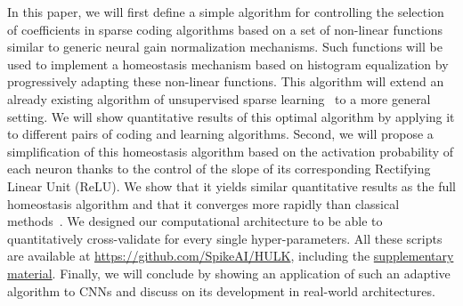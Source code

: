 \documentclass[vision,article,submit,oneauthor,pdftex]{Definitions/mdpi}
\newcommand{\Website}{https://spikeai.github.io/HULK}%
\begin{document}
In this paper, we will first define a simple algorithm for controlling the selection of coefficients in sparse coding algorithms based on a set of non-linear functions similar to generic neural gain normalization mechanisms. Such functions will be used to implement a homeostasis mechanism based on histogram equalization by progressively adapting these non-linear functions. This algorithm will extend an already existing algorithm of unsupervised sparse learning~\citep{Perrinet10shl} to a more general setting. We will show quantitative results of this optimal algorithm by applying it to different pairs of coding and learning algorithms. Second, we will propose a simplification of this homeostasis algorithm based on the activation probability of each neuron thanks to the control of the slope of its corresponding Rectifying Linear Unit (ReLU). We show that it yields similar quantitative results as the full homeostasis algorithm and that it converges more rapidly than classical methods~\citep{Olshausen97, Sandin17}. We designed our computational architecture to be able to quantitatively cross-validate for every single hyper-parameters. All these scripts are available at \url{https://github.com/SpikeAI/HULK}, including the \href{\Website}{supplementary material}. %
Finally, we will conclude by showing an application of such an adaptive algorithm to CNNs and discuss on its development in real-world architectures.
%
%
\end{document}
